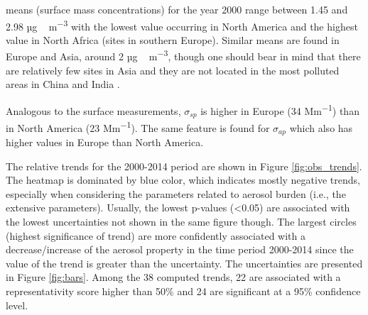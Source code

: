 \documentclass[acp, manuscript]{copernicus}
\begin{document}
 means (surface mass concentrations) for the year 2000 range between 1.45 and 2.98 \unit{µg\,m^{-3}} with the lowest value occurring in North America and the highest value in North Africa (sites in southern Europe). Similar means are found in Europe and Asia, around 2 \unit{µg\,m^{-3}}, though one should bear in mind that there are relatively few sites in Asia and they are not located in the most polluted areas in China and India \citep{aas2019global}.

Analogous to the surface  measurements, $\sigma_{sp}$ is higher in Europe (34 \unit{Mm^{-1}}) than in North America (23 \unit{Mm^{-1}}). The same feature is found for $\sigma_{ap}$ which also has higher values in Europe than North America.



The relative trends for the 2000-2014 period are shown in Figure \ref{fig:obs_trends}. The heatmap is dominated by blue color, which indicates mostly negative trends, especially when considering the parameters related to aerosol burden (i.e., the extensive parameters). Usually, the lowest p-values (<0.05) are associated with the lowest uncertainties not shown in the same figure though. The largest circles (highest significance of trend) are more confidently associated with a decrease/increase of the aerosol property in the time period 2000-2014 since the value of the trend is greater than the uncertainty. The uncertainties are presented in Figure \ref{fig:bars}. Among the 38 computed trends, 22 are associated with a representativity score higher than 50\% and 24 are significant at a 95\% confidence level.
\end{document}
